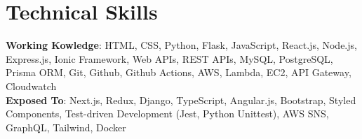\documentclass[letterpaper,11pt]{article}
\makeatletter
\newcommand{\resumeSubheading}[4]{
  \vspace{-2pt}\item
    \begin{tabular*}{0.97\textwidth}[t]{l@{\extracolsep{\fill}}r}
      \textbf{#1} & #2 \\
      \textit{\small#3} & \textit{\small #4} \\
    \end{tabular*}\vspace{-7pt}
}
\newcommand{\resumeSubHeadingListStart}{\begin{itemize}[leftmargin=0.15in, label={}]}
\newcommand{\resumeSubHeadingListEnd}{\end{itemize}}
\makeatother
\begin{document}
\section{Technical Skills}
 \begin{itemize}[leftmargin=0.15in, label={}]
    \small{\item{
     \textbf{Working Kowledge}{: HTML, CSS, Python, Flask, JavaScript, React.js, Node.js, Express.js, Ionic Framework, Web APIs, REST APIs, MySQL, PostgreSQL, Prisma ORM, Git, Github, Github Actions, AWS, Lambda, EC2, API Gateway, Cloudwatch } \\
     \vspace{4pt} 
     \textbf{Exposed To}{: Next.js, Redux, Django, TypeScript, Angular.js, Bootstrap, Styled Components, Test-driven Development (Jest, Python Unittest), AWS SNS, GraphQL, Tailwind, Docker} \\ 
    }}
 \end{itemize} 




 \vspace{4pt}
\end{document}
